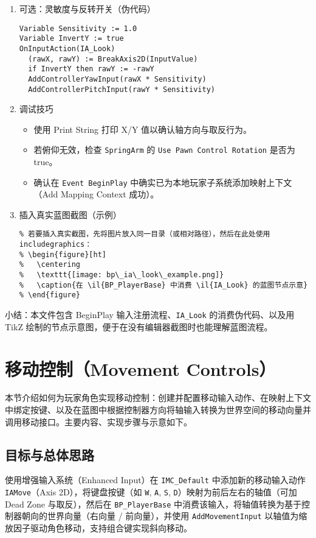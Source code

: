 \documentclass[10pt,CJKmath]{zhbook-v1}
\newcommand{\il}[1]{\texttt{#1}}%
\begin{document}
\begin{enumerate}
  \item 可选：灵敏度与反转开关（伪代码）
\begin{verbatim}
Variable Sensitivity := 1.0
Variable InvertY := true
OnInputAction(IA_Look)
  (rawX, rawY) := BreakAxis2D(InputValue)
  if InvertY then rawY := -rawY
  AddControllerYawInput(rawX * Sensitivity)
  AddControllerPitchInput(rawY * Sensitivity)
\end{verbatim}

  \item 调试技巧
    \begin{itemize}
      \item 使用 Print String 打印 X/Y 值以确认轴方向与取反行为。
      \item 若俯仰无效，检查 \il{SpringArm} 的 \il{Use Pawn Control Rotation} 是否为 true。
      \item 确认在 \il{Event BeginPlay} 中确实已为本地玩家子系统添加映射上下文（Add Mapping Context 成功）。
    \end{itemize}

  \item 插入真实蓝图截图（示例）
    \begin{verbatim}
% 若要插入真实截图，先将图片放入同一目录（或相对路径），然后在此处使用 includegraphics：
% \begin{figure}[ht]
%   \centering
%   \texttt{[image: bp\_ia\_look\_example.png]}
%   \caption{在 \il{BP_PlayerBase} 中消费 \il{IA_Look} 的蓝图节点示意}
% \end{figure}
    \end{verbatim}

\end{enumerate}

\bigskip
\noindent 小结：本文件包含 BeginPlay 输入注册流程、\il{IA_Look} 的消费伪代码、以及用 TikZ 绘制的节点示意图，便于在没有编辑器截图时也能理解蓝图流程。



\section{移动控制（Movement Controls）}

本节介绍如何为玩家角色实现移动控制：创建并配置移动输入动作、在映射上下文中绑定按键、以及在蓝图中根据控制器方向将轴输入转换为世界空间的移动向量并调用移动接口。主要内容、实现步骤与示意如下。

\subsection{目标与总体思路}
使用增强输入系统（Enhanced Input）在 \il{IMC_Default} 中添加新的移动输入动作 \il{IAMove}（Axis 2D），将键盘按键（如 \il{W}, \il{A}, \il{S}, \il{D}）映射为前后左右的轴值（可加 Dead Zone 与取反），然后在 \il{BP_PlayerBase} 中消费该输入，将轴值转换为基于控制器朝向的世界向量（右向量 / 前向量），并使用 \il{AddMovementInput} 以轴值为缩放因子驱动角色移动，支持组合键实现斜向移动。
\end{document}
